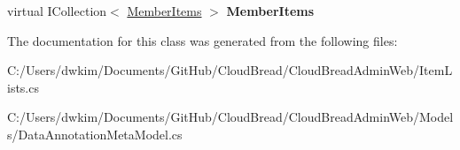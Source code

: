 \begin{DoxyCompactItemize}
\item 
virtual I\+Collection$<$ \hyperlink{class_cloud_bread_admin_web_1_1_member_items}{Member\+Items} $>$ {\bfseries Member\+Items}\hypertarget{class_cloud_bread_admin_web_1_1_item_lists_aa553923398f5f7d8fd9bca95c5dd2ba5}{}\label{class_cloud_bread_admin_web_1_1_item_lists_aa553923398f5f7d8fd9bca95c5dd2ba5}

\end{DoxyCompactItemize}


The documentation for this class was generated from the following files\+:\begin{DoxyCompactItemize}
\item 
C\+:/\+Users/dwkim/\+Documents/\+Git\+Hub/\+Cloud\+Bread/\+Cloud\+Bread\+Admin\+Web/Item\+Lists.\+cs\item 
C\+:/\+Users/dwkim/\+Documents/\+Git\+Hub/\+Cloud\+Bread/\+Cloud\+Bread\+Admin\+Web/\+Models/Data\+Annotation\+Meta\+Model.\+cs\end{DoxyCompactItemize}
